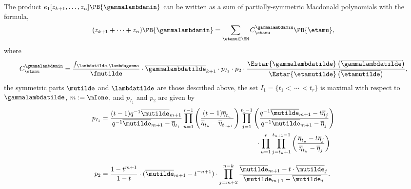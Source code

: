 \begin{thm}\label{Pieriformula}
The product $e_1[z_{k+1},\dotsc, z_n] \PB{\gammalambdamin}$ can be written as a sum of partially-symmetric Macdonald polynomials with the formula,
\[ (z_{k+1} + \dotsm + z_n)\PB{\gammalambdamin} = \sum_{\etamu \in \MM} C^{\gammalambdamin}_{\etamu} \PB{\etamu},\]
where
\[C^{\gammalambdamin}_{\etamu} = \frac{f_{\lambdatilde,\lambdagamma}}{\fmutilde} \cdot \overline{\gammalambdatilde}_{k+1} \cdot p_{I_1} \cdot p_{2}\cdot \frac{\Estar{\gammalambdatilde}\left(\overline{\gammalambdatilde} \right)}{\Estar{\etamutilde} \left( \overline{\etamutilde}\right)}, \]
 the symmetric parts $\mutilde$ and $\lambdatilde$ are those described above, the set $I_1=\{t_1 < \, \dotsm \, < t_r\}$ is maximal with respect to $\gammalambdatilde$, $m := \mIone$, and $p_{I_1}$ and $p_{2}$ are given by
\begin{align*}
    p_{I_1}     &= \frac{(t-1)q^{-1} \overline{\mutilde}_{m+1}}{q^{-1} \overline{\mutilde}_{m+1}-\overline{\eta}_{t_1}} \prod_{u=1}^{r-1} \left(\frac{(t-1) \overline{\eta}_{t_u}}{ \overline{\eta}_{t_u}-\overline{\eta}_{t_{u+1}}}\right)  \prod_{j=1}^{t_1-1} \left( \frac{q^{-1} \overline{\mutilde}_{m+1} - t \overline{\eta}_j}{q^{-1} \overline{\mutilde}_{m+1} -  \overline{\eta}_j} \right) \\ & \hspace*{8cm} \cdot \prod_{u=1}^{r} \prod_{j=t_u+1}^{t_{u+1}-1}  \left(\frac{\overline{\eta}_{t_u} - t \overline{\eta}_j}{ \overline{\eta}_{t_u} -  \overline{\eta}_j} \right)\\[3mm]
    p_{2} &= \frac{1-t^{m+1}}{1-t}\cdot (\overline{\mutilde}_{m+1} - t^{-n+1}) \cdot \prod_{j=m+2}^{n-k} \frac{\overline{\mutilde}_{m+1} - t \cdot \overline{\mutilde}_j}{\overline{\mutilde}_{m+1} - \overline{\mutilde}_j}.
\end{align*}
\end{thm}
